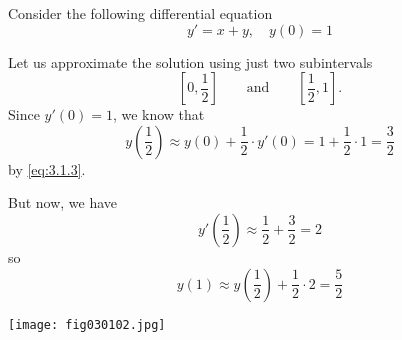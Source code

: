 \documentclass{ximera}
\begin{document}
\begin{example}\label{ex:eulerIntro1}

Consider the following differential equation
$$y' = x+y,\quad y(0)=1$$
 
Let us approximate the solution using just two subintervals
$$
\left[0,\frac{1}{2}\right]\qquad\text{and}\qquad \left[\frac{1}{2},1\right].
$$
Since $y'(0) = 1$, we know that
$$
y\left(\frac{1}{2}\right)\approx y(0)+\frac{1}{2}\cdot y'(0)= 1+ \frac{1}{2}\cdot 1 = \frac{3}{2}
$$
by \eqref{eq:3.1.3}.


\begin{center}
\end{center}



But now, we have
$$
y'\left(\frac{1}{2}\right) \approx \frac{1}{2}+\frac{3}{2} = 2
$$
so
$$
y(1) \approx  y\left(\frac{1}{2}\right)+\frac{1}{2} \cdot 2= \frac{5}{2}
$$

\begin{image}
 \texttt{[image: fig030102.jpg]} 
\end{image}


\end{example}
\end{document}
